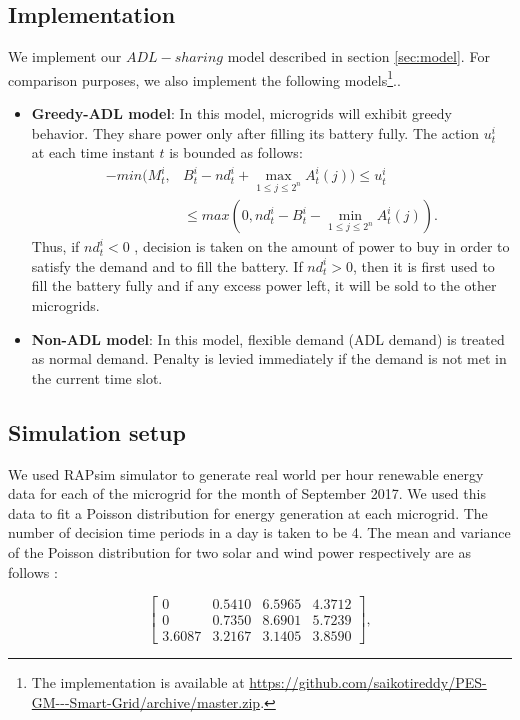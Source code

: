 \subsection{Implementation}
We implement our $ADL-sharing$ model described in section \ref{sec:model}. For comparison purposes, we also implement the following models\footnote{The implementation is available at \url{https://github.com/saikotireddy/PES-GM---Smart-Grid/archive/master.zip}.}.. 
\begin{itemize}
	\item \textbf{Greedy-ADL model}: In this model, microgrids will exhibit greedy behavior. They share power only after filling its battery fully. The action $u_t^i$ at each time instant $t$ is bounded as follows:  
	\begin{align}
	-min(M_t^i, & B_t^i - nd_t^i + \max_{1\leq j \leq 2^n} A_t^i(j) ) \leq u_t^i \nonumber\\ &\leq max(0, nd_t^i - B_t^i - \min_{1\leq j \leq 2^n} A_t^i(j)).
	\end{align}
	Thus, if $ nd_t^i < 0$ , decision is taken on the amount of power to buy in order to satisfy the demand and to fill the battery. If $ nd_t^i > 0$, then it is first used to fill the battery fully and if any excess power left, it will be sold to the other microgrids.
	
	\item \textbf{Non-ADL model}:  In this model, flexible demand (ADL demand) is treated as normal demand. Penalty is levied immediately if the demand is not met in the current time slot.
\end{itemize}
\subsection{Simulation setup}
We used RAPsim simulator to generate real world per hour renewable energy data for each of the microgrid  for the month of September 2017. We used this data to fit a Poisson distribution for energy generation at each microgrid. The number of decision time periods in a day is taken to be 4. The mean and variance of the Poisson distribution for two solar and wind power respectively are as follows :

$$ \left[ \begin{array}{ccccc}
	0 & 0.5410 & 6.5965 & 4.3712 \\
	0 & 0.7350 & 8.6901 & 5.7239 \\
	3.6087 & 3.2167 & 3.1405 & 3.8590
\end{array} \right],$$

